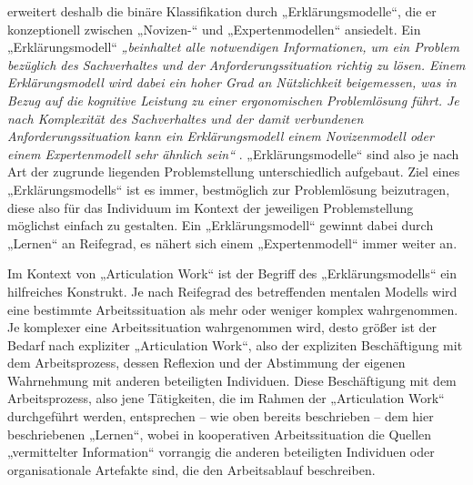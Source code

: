 \citet{Ifenthaler06} erweitert deshalb die binäre Klassifikation durch „Erklärungsmodelle“, die er konzeptionell zwischen „Novizen-“ und „Expertenmodellen“ ansiedelt. Ein „Erklärungsmodell“ \emph{„beinhaltet alle notwendigen Informationen, um ein Problem bezüglich des Sachverhaltes und der Anforderungssituation richtig zu lösen. Einem Erklärungsmodell wird dabei ein hoher Grad an Nützlichkeit beigemessen, was in Bezug auf die kognitive Leistung zu einer ergonomischen Problemlösung führt. Je nach Komplexität des Sachverhaltes und der damit verbundenen Anforderungssituation kann ein Erklärungsmodell einem Novizenmodell oder einem Expertenmodell sehr ähnlich sein“} \citet[][S. 21]{Ifenthaler06}. „Erklärungsmodelle“ sind also je nach Art der zugrunde liegenden Problemstellung unterschiedlich aufgebaut. Ziel eines „Erklärungsmodells“ ist es immer, bestmöglich zur Problemlösung beizutragen, diese also für das Individuum im Kontext der jeweiligen Problemstellung möglichst einfach zu gestalten. Ein „Erklärungsmodell“ gewinnt dabei durch „Lernen“ an Reifegrad, es nähert sich einem „Expertenmodell“ immer weiter an.

Im \wichtig Kontext von „Articulation Work“ ist der Begriff des „Erklärungsmodells“ ein hilfreiches Konstrukt. Je nach Reifegrad des betreffenden mentalen Modells wird eine bestimmte Arbeitssituation als mehr oder weniger komplex wahrgenommen. Je komplexer eine Arbeitssituation wahrgenommen wird, desto größer ist der Bedarf nach expliziter „Articulation Work“, also der expliziten Beschäftigung mit dem Arbeitsprozess, dessen Reflexion und der Abstimmung der eigenen Wahrnehmung mit anderen beteiligten Individuen. Diese Beschäftigung mit dem Arbeitsprozess, also jene Tätigkeiten, die im Rahmen der „Articulation Work“ durchgeführt werden, entsprechen -- wie oben bereits beschrieben -- dem hier beschriebenen „Lernen“, wobei in kooperativen Arbeitssituation die Quellen „vermittelter Information“ vorrangig die anderen beteiligten Individuen oder organisationale Artefakte sind, die den Arbeitsablauf beschreiben. 


